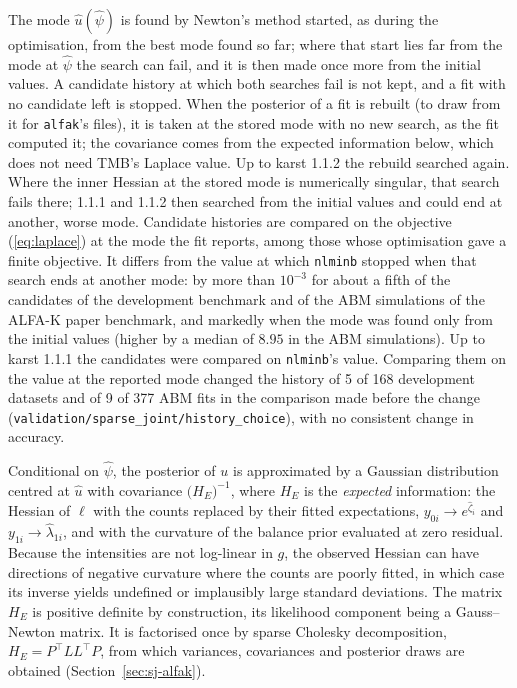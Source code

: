 \documentclass[11pt]{article}
\begin{document}
The mode $\hat u(\hat\psi)$ is found by Newton's method started, as during
the optimisation, from the best mode found so far; where that start lies far
from the mode at $\hat\psi$ the search can fail, and it is then made once more
from the initial values. A candidate history at which both searches fail is
not kept, and a fit with no candidate left is stopped. When the posterior of
a fit is rebuilt (to draw from it for \texttt{alfak}'s files), it is taken
at the stored mode with no new search, as the fit computed it; the covariance
comes from the expected information below, which does not need TMB's Laplace
value. Up to karst 1.1.2 the rebuild searched again. Where the inner Hessian
at the stored mode is numerically singular, that search fails there; 1.1.1
and 1.1.2 then searched from the initial values and could end at another,
worse mode. Candidate histories
are compared on the objective (\ref{eq:laplace}) at the mode the fit
reports, among those whose optimisation gave a finite objective. It differs
from the value at which \texttt{nlminb} stopped when that search ends at
another mode: by more than $10^{-3}$ for about a fifth of the candidates of
the development benchmark and of the ABM simulations of the ALFA-K paper
benchmark, and markedly when the mode was found only from the initial values
(higher by a median of $8.95$ in the ABM simulations). Up to karst 1.1.1 the candidates were compared on
\texttt{nlminb}'s value. Comparing them on the value at the reported mode
changed the history of 5 of 168 development datasets and of 9 of 377 ABM fits
in the comparison made before the change
(\texttt{validation/sparse\_joint/history\_choice}), with no consistent
change in accuracy.

Conditional on $\hat\psi$, the posterior of $u$ is approximated by a Gaussian
distribution centred at $\hat u$ with covariance $\bigl(H_E\bigr)^{-1}$,
where $H_E$ is the \emph{expected} information: the Hessian of $\ell$ with the
counts replaced by their fitted expectations, $y_{0i}\to e^{\hat\zeta_i}$ and
$y_{1i}\to\hat\lambda_{1i}$, and with the curvature of the balance prior
evaluated at zero residual. Because the intensities are not log-linear in $g$,
the observed Hessian can have directions of negative curvature where the
counts are poorly fitted, in which case its inverse yields undefined or
implausibly large standard deviations. The matrix $H_E$ is positive definite
by construction, its likelihood component being a Gauss--Newton matrix. It is
factorised once by sparse Cholesky decomposition, $H_E=P^\top LL^\top P$,
from which variances, covariances and posterior draws are obtained
(Section~\ref{sec:sj-alfak}).
\end{document}
